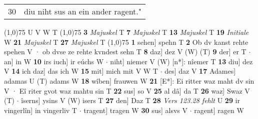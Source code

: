 \documentclass[8pt,a4paper,notitlepage]{article}
\begin{document}
\begin{table}[ht]
\begin{minipage}[t]{0.5\linewidth}
\begin{tabular}{rl}
30 & diu niht sus an ein ander ragent."\\ 
\end{tabular}
\scriptsize
\line(1,0){75} \newline
U V W T \newline
\line(1,0){75} \newline
\textbf{3} \textit{Majuskel} T  \textbf{7} \textit{Majuskel} T  \textbf{13} \textit{Majuskel} T  \textbf{19} \textit{Initiale} W  \textbf{21} \textit{Majuskel} T  \textbf{27} \textit{Majuskel} T  \newline
\line(1,0){75} \newline
\textbf{1} sehen] spehn T \textbf{2} Ob dv kanst rehte spehen V · ob dvse ze rehte kvndest sehn T \textbf{8} daz] dez V (W) (T) \textbf{9} der] er T  $\cdot$ an] in W \textbf{10} irs iuch] ir eúchs W  $\cdot$ niht] niemer V (W) [n*]: nîemer  T \textbf{13} diu] dez V \textbf{14} ich daz] das ich W \textbf{15} mit] mich mit V W T  $\cdot$ des] daz V \textbf{17} Adames] adamas U (T) adams W \textbf{18} wîben] frauwen W \textbf{21} [E*]: Ei ritter waz maht dv sin V · Eî riter gvot waz mahtu sin T \textbf{22} sus] so V \textbf{25} al dâ] da T \textbf{26} waz] Swaz V (T)  $\cdot$ îserns] ysins V (W) isers T \textbf{27} den] Daz T \textbf{28} \textit{Vers 123.28 fehlt} U  \textbf{29} ir vingerlîn] in vingerliv T  $\cdot$ tragent] tragen W \textbf{30} sus] alsvs V  $\cdot$ ragent] ragen W \newline
\end{minipage}
\end{table}
\end{document}
